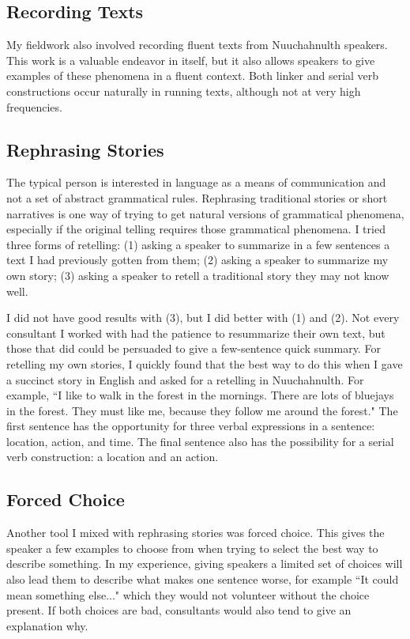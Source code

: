 \subsection{Recording Texts}

My fieldwork also involved recording fluent texts from Nuuchahnulth speakers. This work is a valuable endeavor in itself, but it also allows speakers to give examples of these phenomena in a fluent context. Both linker and serial verb constructions occur naturally in running texts, although not at very high frequencies.

\subsection{Rephrasing Stories}

The typical person is interested in language as a means of communication and not a set of abstract grammatical rules. Rephrasing traditional stories or short narratives is one way of trying to get natural versions of grammatical phenomena, especially if the original telling requires those grammatical phenomena. I tried three forms of retelling: (1) asking a speaker to summarize in a few sentences a text I had previously gotten from them; (2) asking a speaker to summarize my own story; (3) asking a speaker to retell a traditional story they may not know well.

I did not have good results with (3), but I did better with (1) and (2). Not every consultant I worked with had the patience to resummarize their own text, but those that did could be persuaded to give a few-sentence quick summary. For retelling my own stories, I quickly found that the best way to do this when I gave a succinct story in English and asked for a retelling in Nuuchahnulth. For example, ``I like to walk in the forest in the mornings. There are lots of bluejays in the forest. They must like me, because they follow me around the forest." The first sentence has the opportunity for three verbal expressions in a sentence: location, action, and time. The final sentence also has the possibility for a serial verb construction: a location and an action.

\subsection{Forced Choice}

Another tool I mixed with rephrasing stories was forced choice. This gives the speaker a few examples to choose from when trying to select the best way to describe something. In my experience, giving speakers a limited set of choices will also lead them to describe what makes one sentence worse, for example ``It could mean something else..." which they would not volunteer without the choice present. If both choices are bad, consultants would also tend to give an explanation why.

